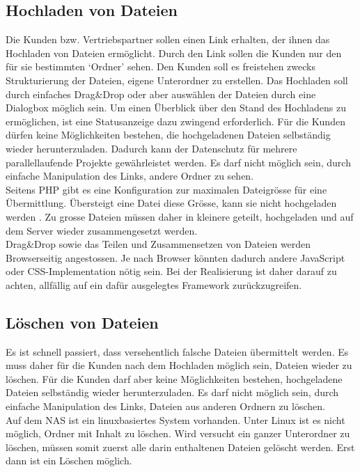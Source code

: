 \subsection{Hochladen von Dateien}
Die Kunden bzw. Vertriebspartner sollen einen Link erhalten, der ihnen das Hochladen von Dateien ermöglicht. Durch den Link sollen die Kunden nur den für sie bestimmten `Ordner' sehen. 
Den Kunden soll es freistehen zwecks Strukturierung der Dateien, eigene Unterordner zu erstellen.
Das Hochladen soll durch einfaches Drag\&Drop oder aber auswählen der Dateien durch eine Dialogbox möglich sein. 
Um einen Überblick über den Stand des Hochladens zu ermöglichen, ist eine Statusanzeige dazu zwingend erforderlich. 
Für die Kunden dürfen keine Möglichkeiten bestehen, die hochgeladenen Dateien selbständig wieder herunterzuladen. 
Dadurch kann der Datenschutz für mehrere parallellaufende Projekte gewährleistet werden.
Es darf nicht möglich sein, durch einfache Manipulation des Links, andere Ordner zu sehen.  
\\
Seitens PHP gibt es eine Konfiguration zur maximalen Dateigrösse für eine Übermittlung. Übersteigt eine Datei diese Grösse, kann sie nicht hochgeladen werden \cite{PHPpitfalls}. 
Zu grosse Dateien müssen daher in kleinere geteilt, hochgeladen und auf dem Server wieder zusammengesetzt werden.
\\ 
Drag\&Drop sowie das Teilen und Zusammensetzen von Dateien werden Browserseitig angestossen. Je nach Browser könnten dadurch andere JavaScript oder CSS-Implementation nötig sein.
Bei der Realisierung ist daher darauf zu achten, allfällig auf ein dafür ausgelegtes Framework zurückzugreifen. 

\subsection{Löschen von Dateien}
Es ist schnell passiert, dass versehentlich falsche Dateien übermittelt werden. 
Es muss daher für die Kunden nach dem Hochladen möglich sein, Dateien wieder zu löschen. 
Für die Kunden darf aber keine Möglichkeiten bestehen, hochgeladene Dateien selbständig wieder herunterzuladen. 
Es darf nicht möglich sein, durch einfache Manipulation des Links, Dateien aus anderen Ordnern zu löschen.
\\
Auf dem NAS ist ein linuxbasiertes System vorhanden. Unter Linux ist es nicht möglich, Ordner mit Inhalt zu löschen. 
Wird versucht ein ganzer Unterordner zu löschen, müssen somit zuerst alle darin enthaltenen Dateien gelöscht werden. Erst dann ist ein Löschen möglich.

